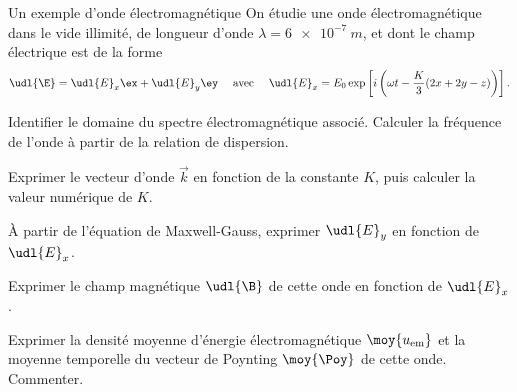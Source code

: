 
\begin{exo}[PC][2][TD]{Un exemple d'onde électromagnétique}
	On étudie une onde électromagnétique dans le vide illimité, de longueur d'onde $\lambda=\SI{6e-7}{m}$, et dont le champ électrique est de la forme
	$$
	\udl{\E} =  \udl{E}_{x} \ex+\udl{E}_{y} \ey \quad \text { avec } \quad \udl{E}_{x}=E_{0} \exp \left[i\left(\omega t - \frac{K}{3}(2 x+2 y-z)\right)\right].
$$
\begin{quest}
	\item Identifier le domaine du spectre électromagnétique associé. Calculer la fréquence de l'onde à partir de la relation de dispersion. 

	\item Exprimer le vecteur d'onde $\Vec{k}$ en fonction de la constante $K$, puis calculer la valeur numérique de $K$. 

	\item À partir de l'équation de Maxwell-Gauss, exprimer $\udl{E}_{y}$ en fonction de $\udl{E}_{x}$.

	\item Exprimer le champ magnétique $\udl{\B}$ de cette onde en fonction de $\udl{E}_{x}$.

	\item Exprimer la densité moyenne d'énergie électromagnétique $\moy{u_{\rm em}}$ et la moyenne temporelle du vecteur de Poynting $\moy{\Poy}$ de cette onde. Commenter.
\end{quest}
\end{exo}


